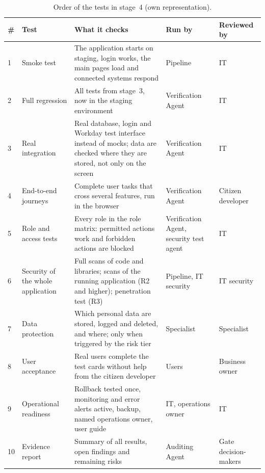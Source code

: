 \documentclass[10pt,a4paper]{article}
\begin{document}
\begin{table}[H]
    \centering
    \small
    \caption{Order of the tests in stage~4 (own representation).}
    \label{tab:g4-test-sequence}
    \begin{tabular}{p{0.4cm} p{2.5cm} p{5.3cm} p{2.4cm} p{2.2cm}}
    \hline
    \textbf{\#} & \textbf{Test} & \textbf{What it checks} & \textbf{Run by} &
        \textbf{Reviewed by} \\
    \hline
    1 & Smoke test & The application starts on staging, login works, the main
        pages load and connected systems respond & Pipeline & IT \\
    2 & Full regression & All tests from stage~3, now in the staging
        environment & Verification Agent & IT \\
    3 & Real integration & Real database, login and Workday test interface
        instead of mocks; data are checked where they are stored, not only
        on the screen & Verification Agent & IT \\
    4 & End-to-end journeys & Complete user tasks that cross several
        features, run in the browser & Verification Agent & Citizen
        developer \\
    5 & Role and access tests & Every role in the role matrix: permitted
        actions work and forbidden actions are blocked & Verification Agent,
        security test agent & IT \\
    6 & Security of the whole application & Full scans of code and libraries;
        scans of the running application (R2 and higher); penetration test
        (R3) & Pipeline, IT security & IT security \\
    7 & Data protection & Which personal data are stored, logged and deleted,
        and where; only when triggered by the risk tier & Specialist &
        Specialist \\
    8 & User acceptance & Real users complete the test cards without help
        from the citizen developer & Users & Business owner \\
    9 & Operational readiness & Rollback tested once, monitoring and error
        alerts active, backup, named operations owner, user guide & IT,
        operations owner & IT \\
    10 & Evidence report & Summary of all results, open findings and
        remaining risks & Auditing Agent & Gate decision-makers \\
    \hline
    \end{tabular}
\end{table}
\end{document}
